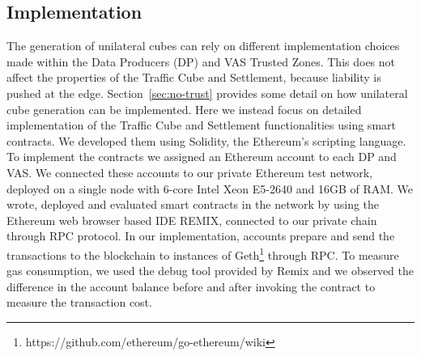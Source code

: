 



\subsection{Implementation}
\label{sec:implementation}
The generation of unilateral cubes can rely on different implementation choices made within the Data Producers (DP) and VAS Trusted Zones. This does not affect the properties of the Traffic Cube and Settlement, because liability is pushed at the edge. Section~\ref{sec:no-trust} provides some detail on how unilateral cube generation can be implemented. 
Here we instead focus on detailed implementation of the Traffic Cube and Settlement functionalities using smart contracts. 
We developed them using Solidity, the Ethereum's scripting language. To implement the contracts we assigned an Ethereum account to each DP and VAS. We connected these accounts to our private Ethereum test network, deployed on a single node with 6-core Intel Xeon E5-2640 and 16GB of RAM. We wrote, deployed and evaluated smart contracts in the network by using the Ethereum web browser based IDE REMIX, connected to our private chain through RPC protocol. In our implementation, accounts prepare and send the transactions to the blockchain to instances of Geth\footnote{https://github.com/ethereum/go-ethereum/wiki } through RPC. To measure gas consumption, we used the debug tool provided by Remix and we observed the difference in the account balance before and after invoking the contract to measure the transaction cost.

